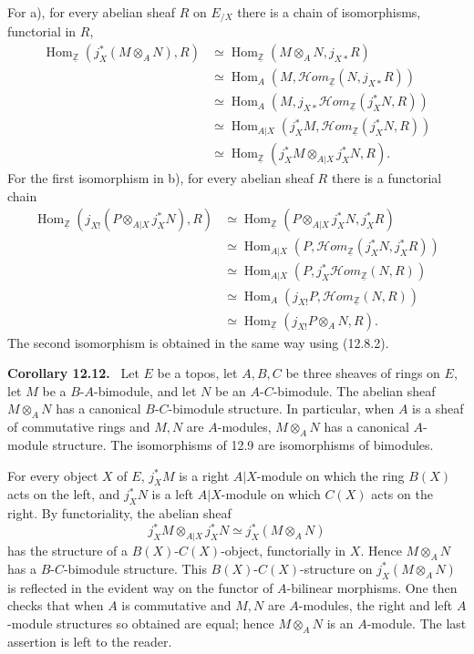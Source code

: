 \documentclass[11pt]{article}
\newcommand{\ZZ}{\mathbb{Z}}
\newcommand{\Hom}{\operatorname{Hom}}
\newcommand{\scrHom}{\mathscr{H}\!om}
\newenvironment{statement}[1]{\par\medskip\noindent\textbf{#1.}\ }{\par\medskip}
\begin{document}
For a), for every abelian sheaf $R$ on $E_{/X}$ there is a chain of isomorphisms, functorial in $R$,
\begin{align*}
\Hom_{\underline{\ZZ}}(j_X^*(M\otimes_A N),R)
&\simeq \Hom_{\underline{\ZZ}}(M\otimes_A N,j_{X*}R)\\
&\simeq \Hom_A(M,\scrHom_{\underline{\ZZ}}(N,j_{X*}R))\\
&\simeq \Hom_A(M,j_{X*}\scrHom_{\underline{\ZZ}}(j_X^*N,R))\\
&\simeq \Hom_{A|X}(j_X^*M,\scrHom_{\underline{\ZZ}}(j_X^*N,R))\\
&\simeq \Hom_{\underline{\ZZ}}(j_X^*M\otimes_{A|X}j_X^*N,R).
\end{align*}
For the first isomorphism in b), for every abelian sheaf $R$ there is a functorial chain
\begin{align*}
\Hom_{\underline{\ZZ}}(j_{X!}(P\otimes_{A|X}j_X^*N),R)
&\simeq \Hom_{\underline{\ZZ}}(P\otimes_{A|X}j_X^*N,j_X^*R)\\
&\simeq \Hom_{A|X}(P,\scrHom_{\underline{\ZZ}}(j_X^*N,j_X^*R))\\
&\simeq \Hom_{A|X}(P,j_X^*\scrHom_{\underline{\ZZ}}(N,R))\\
&\simeq \Hom_A(j_{X!}P,\scrHom_{\underline{\ZZ}}(N,R))\\
&\simeq \Hom_{\underline{\ZZ}}(j_{X!}P\otimes_A N,R).
\end{align*}
The second isomorphism is obtained in the same way using (12.8.2).

\begin{statement}{Corollary 12.12}
Let $E$ be a topos, let $A,B,C$ be three sheaves of rings on $E$, let $M$ be a $B$-$A$-bimodule, and let $N$ be an $A$-$C$-bimodule. The abelian sheaf $M\otimes_A N$ has a canonical $B$-$C$-bimodule structure. In particular, when $A$ is a sheaf of commutative rings and $M,N$ are $A$-modules, $M\otimes_A N$ has a canonical $A$-module structure. The isomorphisms of 12.9 are isomorphisms of bimodules.
\end{statement}

For every object $X$ of $E$, $j_X^*M$ is a right $A|X$-module on which the ring $B(X)$ acts on the left, and $j_X^*N$ is a left $A|X$-module on which $C(X)$ acts on the right. By functoriality, the abelian sheaf
\[
j_X^*M\otimes_{A|X}j_X^*N\simeq j_X^*(M\otimes_A N)
\]
has the structure of a $B(X)$-$C(X)$-object, functorially in $X$. Hence $M\otimes_A N$ has a $B$-$C$-bimodule structure. This $B(X)$-$C(X)$-structure on $j_X^*(M\otimes_A N)$ is reflected in the evident way on the functor of $A$-bilinear morphisms. One then checks that when $A$ is commutative and $M,N$ are $A$-modules, the right and left $A$-module structures so obtained are equal; hence $M\otimes_A N$ is an $A$-module. The last assertion is left to the reader.
\end{document}
